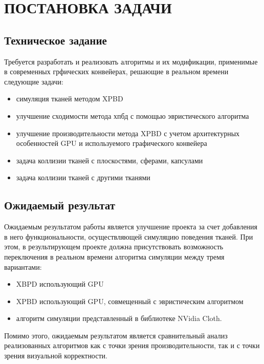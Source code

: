 \chapter{ПОСТАНОВКА ЗАДАЧИ} \label{ch1}

\section{Техническое задание} \label{ch1:sec1}
Требуется разработать и реализовать алгоритмы и их модификации, применимые в современных грфических конвейерах, решающие в реальном времени следующие задачи:
\begin{itemize}
	\item симуляция тканей методом XPBD
	\item улучшение сходимости метода хпбд с помощью эвристического алгоритма
	\item улучшение производительности метода XPBD с учетом архитектурных особенностей GPU и используемого графического конвейера
	\item задача коллизии тканей с плоскостями, сферами, капсулами
	\item задача коллизии тканей с другими тканями
\end{itemize}

\section{Ожидаемый результат} \label{ch1:sec2}
Ожидаемым результатом работы является улучшение проекта  за счет добавления в него функциональности, осуществляющей симуляцию поведения тканей. При этом, в результирующем проекте должна присутствовать возможность переключения в реальном времени алгоритма симуляции между тремя вариантами: 
\begin{itemize}
	\item XBPD использующий GPU
	\item XPBD использующий GPU, совмещенный с эвристическим алгоритмом
	\item алгоритм симуляции представленный в библиотеке NVidia Cloth.
\end{itemize}

Помимо этого, ожидаемым результатом является сравнительный анализ реализованных алгоритмов как с точки зрения производительности, так и с точки зрения визуальной корректности.



